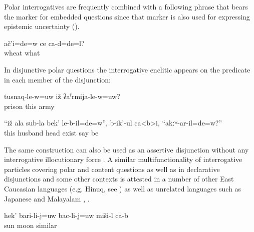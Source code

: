 Polar interrogatives are frequently combined with a following phrase that bears the marker for embedded questions  since that marker is also used for expressing epistemic uncertainty ().
%
\begin{exe}
	\ex	\label{ex:Was it wheat or something else}
	\gll	ač'i=de=w	ce	ca-d=de=l?\\
		wheat	what	\\
	\glt	{}
\end{exe}

In disjunctive polar questions the interrogative enclitic appears on the predicate in each member of the disjunction:
%
\begin{exe}
	\ex	\label{ex:Is he in a prison or in the army}
	\gll	tusnaq-le-w=uw	iž	ʡaˁrmija-le-w=uw?\\
		prison	this	army\\
	\glt	{}

	\ex	\label{ex:‎They say to the wife, Did your husband have a head or not}
	\gll	``iž	ala	sub-la	bek'	le-b-il=de=w'',	b-ik'-ul	ca<b>i,	``akːʷ-ar-il=de=w?''	\\
		this		husband	head	exist	say	be	\\
	\glt	{}
\end{exe}

The same construction can also be used as an assertive disjunction without any interrogative illocutionary force . A similar multifunctionality of interrogative particles covering polar and content questions as well as in declarative disjunctions and some other contexts is attested in a number of other East Caucasian languages (e.g. Hinuq, see ) as well as unrelated languages such as Japanese and Malayalam \citep[2]{Slade2011}, \citep{Uegaki2018}. 
%
\begin{exe}
	\ex	\label{ex:This is similar to the sun or the moon}
	\gll	hek'	bari-li-j=uw	bac-li-j=uw	miši-l	ca-b\\
			sun	moon	similar	\\
	\glt	{}
\end{exe}


